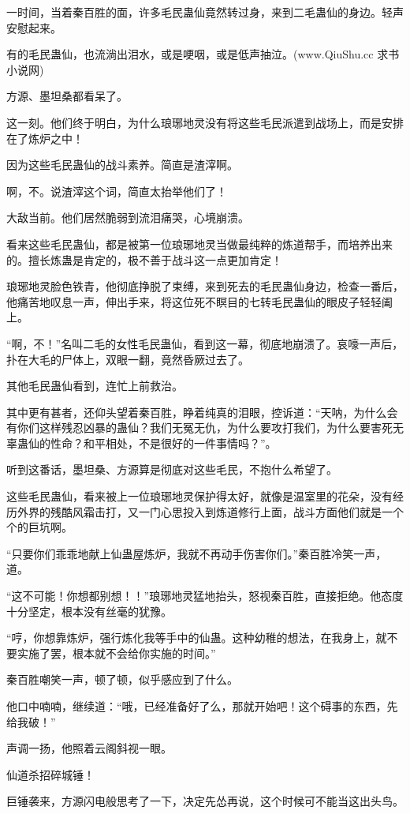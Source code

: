 \begin{this_body}
一时间，当着秦百胜的面，许多毛民蛊仙竟然转过身，来到二毛蛊仙的身边。轻声安慰起来。

有的毛民蛊仙，也流淌出泪水，或是哽咽，或是低声抽泣。(www.QiuShu.cc 求书小说网)

方源、墨坦桑都看呆了。

这一刻。他们终于明白，为什么琅琊地灵没有将这些毛民派遣到战场上，而是安排在了炼炉之中！

因为这些毛民蛊仙的战斗素养。简直是渣滓啊。

啊，不。说渣滓这个词，简直太抬举他们了！

大敌当前。他们居然脆弱到流泪痛哭，心境崩溃。

看来这些毛民蛊仙，都是被第一位琅琊地灵当做最纯粹的炼道帮手，而培养出来的。擅长炼蛊是肯定的，极不善于战斗这一点更加肯定！

琅琊地灵脸色铁青，他彻底挣脱了束缚，来到死去的毛民蛊仙身边，检查一番后，他痛苦地叹息一声，伸出手来，将这位死不瞑目的七转毛民蛊仙的眼皮子轻轻阖上。

“啊，不！”名叫二毛的女性毛民蛊仙，看到这一幕，彻底地崩溃了。哀嚎一声后，扑在大毛的尸体上，双眼一翻，竟然昏厥过去了。

其他毛民蛊仙看到，连忙上前救治。

其中更有甚者，还仰头望着秦百胜，睁着纯真的泪眼，控诉道：“天呐，为什么会有你们这样残忍凶暴的蛊仙？我们无冤无仇，为什么要攻打我们，为什么要害死无辜蛊仙的性命？和平相处，不是很好的一件事情吗？”。

听到这番话，墨坦桑、方源算是彻底对这些毛民，不抱什么希望了。

这些毛民蛊仙，看来被上一位琅琊地灵保护得太好，就像是温室里的花朵，没有经历外界的残酷风霜击打，又一门心思投入到炼道修行上面，战斗方面他们就是一个个的巨坑啊。

“只要你们乖乖地献上仙蛊屋炼炉，我就不再动手伤害你们。”秦百胜冷笑一声，道。

“这不可能！你想都别想！！”琅琊地灵猛地抬头，怒视秦百胜，直接拒绝。他态度十分坚定，根本没有丝毫的犹豫。

“哼，你想靠炼炉，强行炼化我等手中的仙蛊。这种幼稚的想法，在我身上，就不要实施了罢，根本就不会给你实施的时间。”

秦百胜嘲笑一声，顿了顿，似乎感应到了什么。

他口中喃喃，继续道：“哦，已经准备好了么，那就开始吧！这个碍事的东西，先给我破！”

声调一扬，他照着云阁斜视一眼。

仙道杀招碎城锤！

巨锤袭来，方源闪电般思考了一下，决定先怂再说，这个时候可不能当这出头鸟。


\end{this_body}
